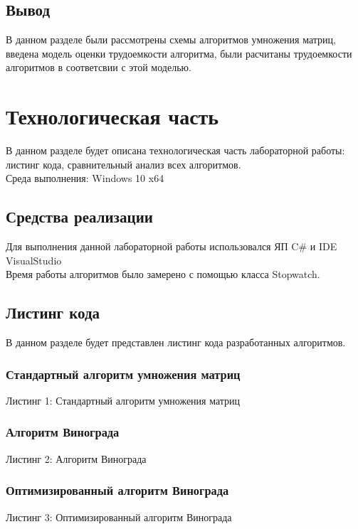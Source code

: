 \documentclass[12pt,a4paper]{article}
\begin{document}
\subsection{Вывод}
В данном разделе были рассмотрены схемы алгоритмов умножения матриц, введена модель оценки трудоемкости алгоритма, были расчитаны трудоемкости алгоритмов в соответсвии с этой моделью.
\clearpage


\section{Технологическая часть}
В данном разделе будет описана технологическая часть лабораторной работы: листинг кода, сравнительный анализ всех алгоритмов.\\
Среда выполнения: Windows 10 x64
\subsection{Средства реализации}
Для выполнения данной лабораторной работы использовался ЯП C\# и IDE VisualStudio \\
Время работы алгоритмов было замерено с помощью класса Stopwatch.
\subsection{Листинг кода}
В данном разделе будет представлен листинг кода разработанных алгоритмов.\\

\subsubsection{Стандартный алгоритм умножения матриц}
\begin{flushleft}
	Листинг 1: Стандартный алгоритм умножения матриц
	
\end{flushleft}
\clearpage

\subsubsection{Алгоритм Винограда}
\begin{flushleft}
	Листинг 2: Алгоритм Винограда
	
\end{flushleft}

\subsubsection{Оптимизированный алгоритм Винограда}
\begin{flushleft}
	Листинг 3: Оптимизированный алгоритм Винограда
	
\end{flushleft}
\clearpage
\end{document}
